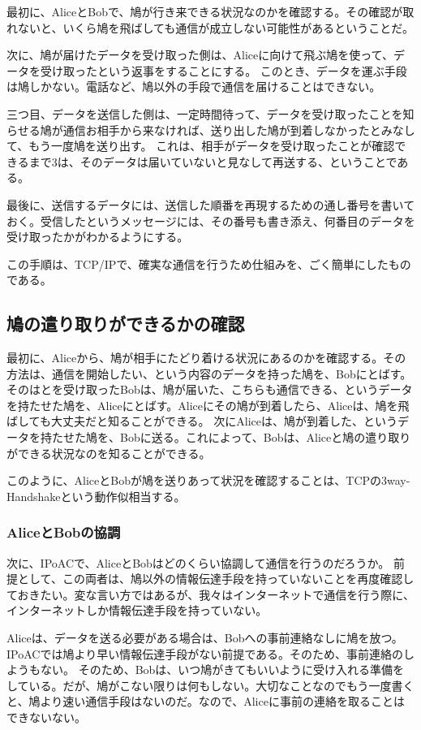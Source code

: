 最初に、AliceとBobで、鳩が行き来できる状況なのかを確認する。その確認が取れないと、いくら鳩を飛ばしても通信が成立しない可能性があるということだ。

次に、鳩が届けたデータを受け取った側は、Aliceに向けて飛ぶ鳩を使って、データを受け取ったという返事をすることにする。
このとき、データを運ぶ手段は鳩しかない。電話など、鳩以外の手段で通信を届けることはできない。

三つ目、データを送信した側は、一定時間待って、データを受け取ったことを知らせる鳩が通信お相手から来なければ、送り出した鳩が到着しなかったとみなして、もう一度鳩を送り出す。
これは、相手がデータを受け取ったことが確認できるまで3は、そのデータは届いていないと見なして再送する、ということである。

最後に、送信するデータには、送信した順番を再現するための通し番号を書いておく。受信したというメッセージには、その番号も書き添え、何番目のデータを受け取ったかがわかるようにする。

この手順は、TCP/IPで、確実な通信を行うため仕組みを、ごく簡単にしたものである。


\subsection{鳩の遣り取りができるかの確認}

最初に、Aliceから、鳩が相手にたどり着ける状況にあるのかを確認する。その方法は、通信を開始したい、という内容のデータを持った鳩を、Bobにとばす。
そのはとを受け取ったBobは、鳩が届いた、こちらも通信できる、というデータを持たせた鳩を、Aliceにとばす。Aliceにその鳩が到着したら、Aliceは、鳩を飛ばしても大丈夫だと知ることができる。
次にAliceは、鳩が到着した、というデータを持たせた鳩を、Bobに送る。これによって、Bobは、Aliceと鳩の遣り取りができる状況なのを知ることができる。

このように、AliceとBobが鳩を送りあって状況を確認することは、TCPの3way-Handshakeという動作似相当する。


\subsubsection{AliceとBobの協調}
次に、IPoACで、AliceとBobはどのくらい協調して通信を行うのだろうか。
前提として、この両者は、鳩以外の情報伝達手段を持っていないことを再度確認しておきたい。変な言い方ではあるが、我々はインターネットで通信を行う際に、インターネットしか情報伝達手段を持っていない。

Aliceは、データを送る必要がある場合は、Bobへの事前連絡なしに鳩を放つ。
IPoACでは鳩より早い情報伝達手段がない前提である。そのため、事前連絡のしようもない。
そのため、Bobは、いつ鳩がきてもいいように受け入れる準備をしている。だが、鳩がこない限りは何もしない。大切なことなのでもう一度書くと、鳩より速い通信手段はないのだ。なので、Aliceに事前の連絡を取ることはできないない。

